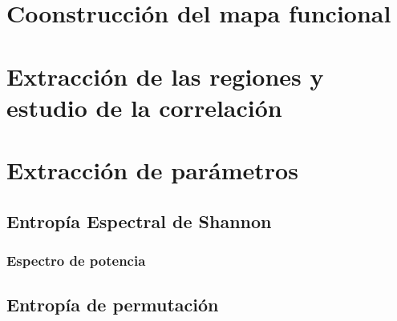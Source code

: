\section{Coonstrucción del mapa funcional}
\section{Extracción de las regiones y estudio de la correlación}
\section{Extracción de parámetros}
\subsection{Entropía Espectral de Shannon}
\subsubsection{Espectro de potencia}
\subsection{Entropía de permutación}

